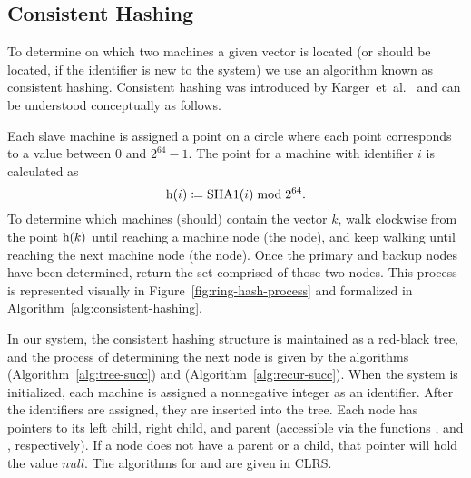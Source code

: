 \subsection{Consistent Hashing}
To determine on which two machines a given vector is located (or should be
located, if the identifier is new to the system) we use an algorithm known as
consistent hashing. Consistent hashing was introduced by
Karger~et~al.~\cite{karger1997} and can be understood conceptually as follows.
\par
Each slave machine is assigned a point on a circle where each point corresponds
to a value between \(0\) and \(2^{64} - 1\). The point for a machine with
identifier \(i\) is calculated as
\begin{equation*}
    \mathrm{h}(i) \coloneqq \mathrm{SHA1}(i) \bmod{2^{64}}.
\end{equation*}
To determine which machines (should) contain the vector \(k\), walk clockwise
from the point \(\mathrm{h}(k)\) until reaching a machine node (the
 node), and keep walking until reaching the next machine node
(the  node). Once the primary and backup nodes have been
determined, return the set comprised of those two nodes. This process is
represented visually in Figure~\ref{fig:ring-hash-process} and formalized in
Algorithm~\ref{alg:consistent-hashing}.
%
\par
In our system, the consistent hashing structure is maintained as a red-black
tree, and the process of determining the next node is given by the algorithms
 (Algorithm~\ref{alg:tree-succ}) and
 (Algorithm~\ref{alg:recur-succ}). When the system is
initialized, each machine is assigned a nonnegative integer as an identifier.
After the identifiers are assigned, they are inserted into the tree. Each node
has pointers to its left child, right child, and parent (accessible via the
functions ,  and ,
respectively). If a node does not have a parent or a child, that pointer will
hold the value \(null\). The algorithms for  and
 are given in CLRS. \cite{cormen2009}
%
